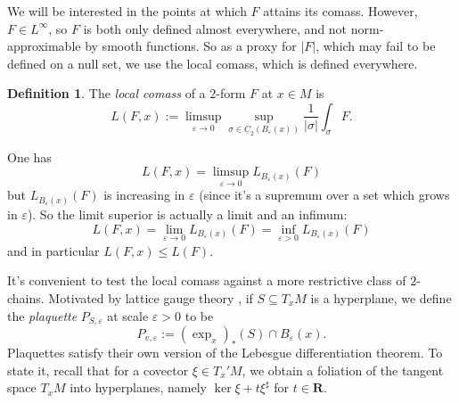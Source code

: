 \documentclass[reqno,11pt]{amsart}
\newcommand{\RR}{\mathbf{R}}
\newcommand{\Chain}{\underline C}
\newcommand{\dfn}[1]{\emph{#1}\index{#1}}
\theoremstyle{definition}
\newtheorem{definition}[theorem]{Definition}
\numberwithin{equation}{section}
\begin{document}
We will be interested in the points at which $F$ attains its comass.
However, $F \in L^\infty$, so $F$ is both only defined almost everywhere, and not norm-approximable by smooth functions.
So as a proxy for $|F|$, which may fail to be defined on a null set, we use the local comass, which is defined everywhere.

\begin{definition}
The \dfn{local comass} of a $2$-form $F$ at $x \in M$ is 
$$L(F, x) := \limsup_{\varepsilon \to 0} \sup_{\sigma \in \Chain_2(B_\varepsilon(x))} \frac{1}{|\sigma|} \int_\sigma F.$$
\end{definition}

One has
$$L(F, x) = \limsup_{\varepsilon \to 0} L_{B_\varepsilon(x)}(F)$$
but $L_{B_\varepsilon(x)}(F)$ is increasing in $\varepsilon$ (since it's a supremum over a set which grows in $\varepsilon$).
So the limit superior is actually a limit and an infimum:
$$L(F, x) = \lim_{\varepsilon \to 0} L_{B_\varepsilon(x)}(F) = \inf_{\varepsilon > 0} L_{B_\varepsilon(x)}(F)$$
and in particular $L(F, x) \leq L(F)$.

It's convenient to test the local comass against a more restrictive class of $2$-chains.
Motivated by lattice gauge theory \cite{Gupta98}, if $S \subseteq T_x M$ is a hyperplane, we define the \dfn{plaquette} $P_{S, \varepsilon}$ at scale $\varepsilon > 0$ to be 
$$P_{v, \varepsilon} := (\exp_x)_*(S) \cap B_\varepsilon(x).$$
Plaquettes satisfy their own version of the Lebesgue differentiation theorem.
To state it, recall that for a covector $\xi \in T_x' M$, we obtain a foliation of the tangent space $T_x M$ into hyperplanes, namely $\ker \xi + t\xi^\sharp$ for $t \in \RR$.
\end{document}
